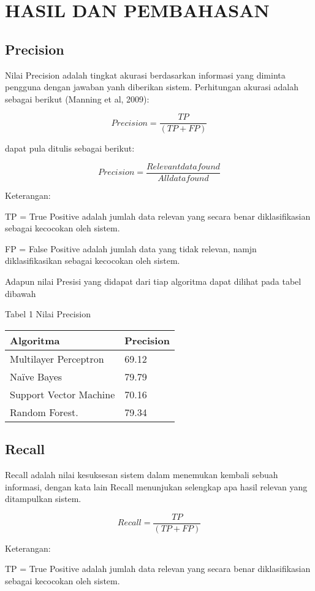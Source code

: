 \documentclass{article}
\begin{document}
\section{HASIL DAN PEMBAHASAN}
\subsection{Precision}
Nilai Precision adalah tingkat akurasi berdasarkan informasi yang diminta pengguna 
dengan jawaban yanh diberikan sistem.
Perhitungan akurasi adalah sebagai berikut (Manning et al, 2009):

$$ Precision=\frac{TP}{(TP + FP)}$$

dapat pula ditulis sebagai berikut:

$$ Precision=\frac{Relevant data found}{All data found}$$

Keterangan:

TP = True Positive adalah jumlah data relevan yang secara benar diklasifikasian sebagai kecocokan oleh sistem.

FP = False Positive adalah jumlah data yang tidak relevan, namjn diklasifikasikan sebagai kecocokan oleh sistem.

Adapun nilai Presisi yang didapat dari tiap algoritma dapat dilihat pada tabel dibawah

\begin{center}
Tabel 1 Nilai Precision

\begin{tabular}{ |p{5cm}||p{3cm}|  }
 \hline
 Algoritma & Precision \\
 \hline
 Multilayer Perceptron   & 69.12    \\
 Naïve Bayes &   79.79  \\
 Support Vector Machine & 70.16 \\
 Random Forest.    & 79.34 \\
 \hline
\end{tabular}
\end{center}
\subsection{Recall}
Recall adalah nilai kesuksesan sistem dalam menemukan kembali sebuah informasi, 
dengan kata lain Recall menunjukan selengkap apa hasil relevan yang ditampulkan 
sistem.

$$ Recall=\frac{TP}{(TP + FP)}$$

Keterangan:

TP = True Positive adalah jumlah data relevan yang secara benar diklasifikasian 
sebagai kecocokan oleh sistem.
\end{document}
